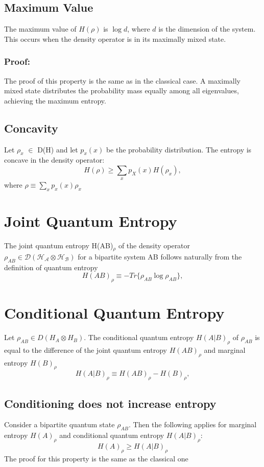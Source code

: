 \subsection{Maximum Value}
The maximum value of $H(\rho)$ is $\log d$, where $d$ is the dimension of the system. This occurs when the density operator is in its maximally mixed state.

\subsubsection{Proof:} 
The proof of this property is the same as in the classical case. A maximally mixed state distributes the probability mass equally among all eigenvalues, achieving the maximum entropy.

\subsection{Concavity}
Let $\rho_x$ $\in$ D(H) and let $p_x(x)$ be the probability distribution. The entropy is concave in the density operator:
\[
H(\rho) \geq \sum_x p_X(x) H(\rho_x),
\]
where $\rho \equiv \sum_xp_x(x)\rho_x$


\section{Joint Quantum Entropy}
The joint quantum entropy H(AB)$_\rho$ of the density operator $\rho_{AB} \in \mathcal{D}(\mathcal{H_A} \otimes \mathcal{H_B}) $ for a bipartite system AB follows naturally from the definition of quantum entropy
\[
H(AB)_\rho \equiv -Tr\{\rho_{AB} \log \rho_{AB}\},
\]


\section{Conditional Quantum Entropy}
Let $\rho_{AB} \in D(H_A \otimes H_B)$. The conditional quantum entropy $H(A|B)_\rho$ of $\rho_{AB}$ is equal to the difference of the joint quantum entropy $H(AB)_\rho$ and marginal entropy $H(B)_\rho$
\[
H(A|B)_\rho \equiv H(AB)_\rho - H(B)_\rho,
\]

\subsection{Conditioning does not increase entropy}
Consider a bipartite quantum state $\rho_{AB}$. Then the following applies for marginal entropy $H(A)_\rho$ and conditional quantum entropy $H(A|B)_\rho$:
\[
H(A)_\rho \geq H(A|B)_\rho
\]
The proof for this property is the same as the classical one


